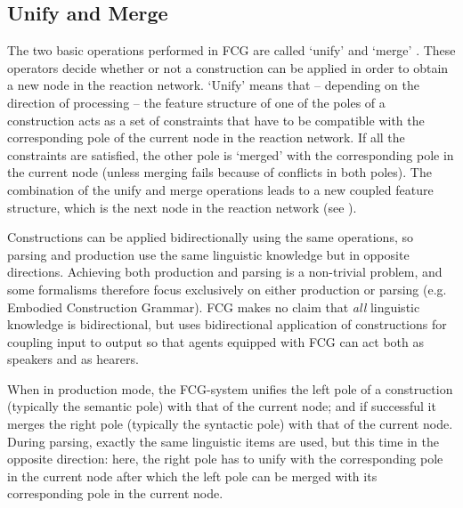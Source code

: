 \subsection{Unify and Merge} 
The two basic operations performed in FCG are called `unify' and `merge' \citep[not to be confused with `merge' in Minimalism]{steels06unify}. These operators decide whether or not a construction can be applied in order to obtain a new node in the reaction network. `Unify' means that -- depending on the direction of processing -- the feature structure of one of the poles of a construction acts as a set of constraints that have to be compatible with the corresponding pole of the current node in the reaction network. If all the constraints are satisfied, the other pole is `merged' with the corresponding pole in the current node (unless merging fails because of conflicts in both poles). The combination of the unify and merge operations leads to a new coupled feature structure, which is the next node in the reaction network (see ).

Constructions can be applied bidirectionally using the same operations, so parsing and production use the same linguistic knowledge but in opposite directions. Achieving both production and parsing is a non-trivial problem, and some formalisms therefore focus exclusively on either production or parsing (e.g. Embodied Construction Grammar). FCG makes no claim that {\em all} linguistic knowledge is bidirectional, but uses bidirectional application of constructions for coupling input to output so that agents equipped with FCG can act both as speakers and as hearers. 

When in production mode, the FCG-system unifies the left pole of a construction (typically the semantic pole) with that of the current node; and if successful it merges the right pole (typically the syntactic pole) with that of the current node. During parsing, exactly the same linguistic items are used, but this time in the opposite direction: here, the right pole has to unify with the corresponding pole in the current node after which the left pole can be merged with its corresponding pole in the current node.

